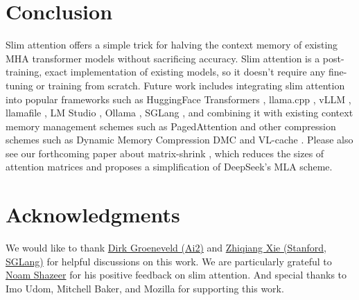 \documentclass{article}
\begin{document}



\section{Conclusion}
Slim attention offers a simple trick for halving the context memory of existing MHA transformer models without sacrificing accuracy. Slim attention is a post-training, exact implementation of existing models, so it doesn't require any fine-tuning or training from scratch. Future work includes integrating slim attention into popular frameworks such as HuggingFace Transformers \citep{HFtransformers}, llama.cpp \citep{llama-cpp},  vLLM \citep{vLLM}, llamafile \citep{llamafile}, LM Studio \citep{lmstudio}, Ollama \citep{ollama}, SGLang \citep{sglang}, and combining it with existing context memory management schemes such as PagedAttention \citep{pagedAttn} and other compression schemes such as Dynamic Memory Compression DMC \citep{DMC} and VL-cache \citep{VL-cache}.
Please also see our forthcoming paper about matrix-shrink \citep{matShrink}, which reduces the sizes of attention matrices and proposes a simplification of DeepSeek's MLA scheme.

\section*{Acknowledgments}
We would like to thank \href{https://scholar.google.com/citations?user=KEhvGNMAAAAJ&hl=en}{Dirk Groeneveld (Ai2)} and \href{https://scholar.google.com/citations?user=Be2fl8sAAAAJ&hl=en}{Zhiqiang Xie (Stanford, SGLang)} for helpful discussions on this work. We are particularly grateful to \href{https://scholar.google.com/citations?user=wsGvgA8AAAAJ&hl=en}{Noam Shazeer} for his positive feedback on slim attention. And special thanks to Imo Udom, Mitchell Baker, and Mozilla for supporting this work.
\end{document}
